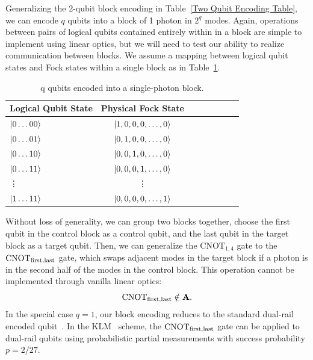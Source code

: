 \documentclass[aps,pra,twocolumn,showpacs,superscriptaddress,floatfix,10pt]{revtex4}
\begin{document}
Generalizing the 2-qubit block encoding in Table~\ref{Two Qubit Encoding Table}, we can encode $q$ qubits into a block of 1 photon in $2^q$ modes. Again, operations between pairs of logical qubits contained entirely within in a block are simple to implement using linear optics, but we will need to test our ability to realize communication between blocks. We assume a  mapping between logical qubit states and Fock states within a single block as in Table~\ref{q Qubit Block Encoding}.
\begin {table}[h]
\begin{center}
	\begin{tabular}{l*{6}{c}r} 
		Logical Qubit State      \quad \quad \quad     & Physical Fock State \\
		\hline 
		\quad \quad \quad $\ket{0\dots00}$     & $\ket{1,0,0,0,\dots,0}$ \\
		\quad \quad \quad $\ket{0\dots01}$            & $\ket{0,1,0,0,\dots,0}$ \\
		\quad \quad \quad $\ket{0\dots10}$            & $\ket{0,0,1,0,\dots,0}$ \\
		\quad \quad \quad $\ket{0\dots11}$            & $\ket{0,0,0,1,\dots,0}$ \\
		\quad \quad \quad \quad \enspace \vdots & \vdots \\
		\quad \quad \quad $\ket{1\dots11}$            & $\ket{0,0,0,0,\dots,1}$ \\
	\end{tabular}
	\caption{ \label{q Qubit Block Encoding} q qubits encoded into a single-photon block.}
\end{center}
\end{table}
Without loss of generality, we can group two blocks together, choose the first qubit in the control block as a control qubit, and the last qubit in the target block as a target qubit. Then, we can generalize the $\mbox{CNOT}_{1,4}$ gate to the $\mbox{CNOT}_{\rm first,last}$ gate, which swaps adjacent modes in the target block if a photon is in the second half of the modes in the control block. This operation cannot be implemented through vanilla linear optics:
\begin{equation}
\mbox{CNOT}_{\rm first,last} \notin \textbf{A}.
\end{equation}
In the special case $q=1$, our block encoding reduces to the standard dual-rail encoded qubit~\cite{Review Paper}. In the KLM~\cite{KLM,KLM2} scheme, the $\mbox{CNOT}_{\rm first,last}$ gate can be applied to dual-rail qubits using probabilistic partial measurements with success probability $p=2/27$. 
\end{document}
